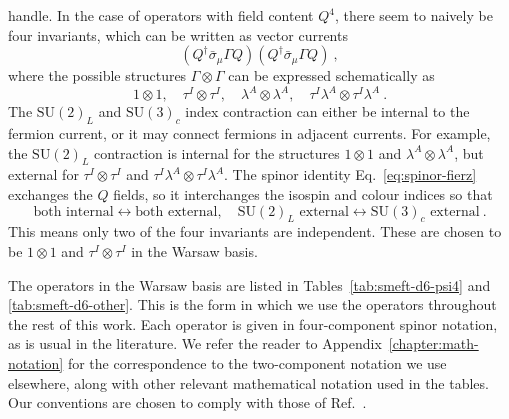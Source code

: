 handle. In the case of operators with field content $Q^{4}$, there seem to
naively be four invariants, which can be written as vector currents
\begin{equation}
  (Q^{\dagger} \bar{\sigma}_{\mu} \Gamma Q) (Q^{\dagger} \bar{\sigma}_{\mu} \Gamma Q) \ ,
\end{equation}
where the possible structures $\Gamma \otimes \Gamma$ can be expressed schematically as
\begin{equation}
  1 \otimes 1,\quad \tau^{I} \otimes \tau^{I},\quad \lambda^{A} \otimes \lambda^{A},\quad \tau^{I} \lambda^{A} \otimes \tau^{I} \lambda^{A} \ .
\end{equation}
The $\mathrm{SU}(2)_{L}$ and $\mathrm{SU}(3)_{c}$ index contraction can either
be internal to the fermion current, or it may connect fermions in adjacent
currents. For example, the $\mathrm{SU}(2)_{L}$ contraction is internal for the
structures $1 \otimes 1$ and $\lambda^{A} \otimes \lambda^{A}$, but external for
$\tau^{I} \otimes \tau^{I}$ and
$\tau^{I} \lambda^{A} \otimes \tau^{I} \lambda^{A}$. The spinor identity
Eq.~\eqref{eq:spinor-fierz} exchanges the $Q$ fields, so it interchanges the
isospin and colour indices so that
\begin{equation}
  \text{both internal} \leftrightarrow \text{both external},\quad \mathrm{SU}(2)_{L} \text{ external} \leftrightarrow \mathrm{SU}(3)_{c} \text{ external} \ .
\end{equation}
This means only two of the four invariants are independent. These are chosen to
be $1 \otimes 1$ and $\tau^{I} \otimes \tau^{I}$ in the Warsaw basis.

The operators in the Warsaw basis are listed in Tables~\ref{tab:smeft-d6-psi4}
and \ref{tab:smeft-d6-other}. This is the form in which we use the operators
throughout the rest of this work. Each operator is given in four-component
spinor notation, as is usual in the literature. We refer the reader to
Appendix~\ref{chapter:math-notation} for the correspondence to the two-component
notation we use elsewhere, along with other relevant mathematical notation used
in the tables. Our conventions are chosen to comply with those of
Ref.~\cite{Aebischer:2017ugx}.


